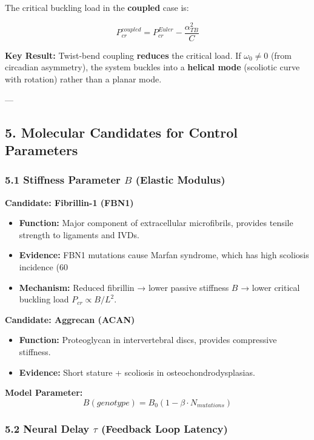 \documentclass[11pt,a4paper]{article}
\begin{document}
The critical buckling load in the \textbf{coupled} case is:

$$
P_{cr}^{coupled} = P_{cr}^{Euler} - \frac{\alpha_{TB}^2}{C}
$$

\textbf{Key Result:} Twist-bend coupling \textbf{reduces} the critical load. If $\omega_0 \neq 0$ (from circadian asymmetry), the system buckles into a \textbf{helical mode} (scoliotic curve with rotation) rather than a planar mode.

---

\subsection{5. Molecular Candidates for Control Parameters}

\subsubsection{5.1 Stiffness Parameter $B$ (Elastic Modulus)}

\textbf{Candidate: Fibrillin-1 (FBN1)}

\begin{itemize}
\item \textbf{Function:} Major component of extracellular microfibrils, provides tensile strength to ligaments and IVDs.
\item \textbf{Evidence:} FBN1 mutations cause Marfan syndrome, which has high scoliosis incidence (60%
\item \textbf{Mechanism:} Reduced fibrillin → lower passive stiffness $B$ → lower critical buckling load $P_{cr} \propto B/L^2$.
\end{itemize}

\textbf{Candidate: Aggrecan (ACAN)}

\begin{itemize}
\item \textbf{Function:} Proteoglycan in intervertebral discs, provides compressive stiffness.
\item \textbf{Evidence:} Short stature + scoliosis in osteochondrodysplasias.
\end{itemize}

\textbf{Model Parameter:}
$$
B(genotype) = B_0 \left(1 - \beta \cdot N_{mutations}\right)
$$

\subsubsection{5.2 Neural Delay $\tau$ (Feedback Loop Latency)}
\end{document}
